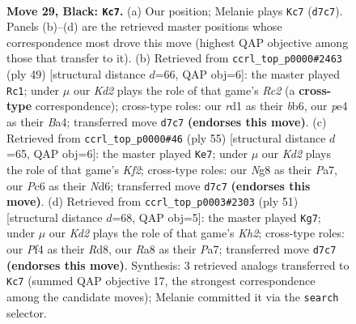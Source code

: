 \documentclass[11pt]{article}
\begin{document}
\clearpage

\begin{figure}[p]\centering
\begin{subfigure}{0.46\textwidth}\centering
\resizebox{\linewidth}{!}{%
\newchessgame
\chessboard[
  setfen={rr4nb/p2k1p1p/P1p3p1/2P5/4Pp1P/8/4NB2/3R1RK1 b - - 1 29},
  showmover=false,
  pgfstyle=straightmove, color=movearrow, markmove={d7-c7}
]}
\caption{}
\end{subfigure}\hfill
\begin{subfigure}{0.46\textwidth}\centering
\resizebox{\linewidth}{!}{%
\newchessgame
\chessboard[
  setfen={2r5/1pr1kp2/pB6/3pPp2/b3nPP1/P7/1R2B2P/5RK1 b - - 2 25},
  showmover=false,
  pgfstyle=straightmove, color=movearrow, markmove={c7-c1}
]}
\caption{}
\end{subfigure}
\\[4pt]
\begin{subfigure}{0.46\textwidth}\centering
\resizebox{\linewidth}{!}{%
\newchessgame
\chessboard[
  setfen={r6r/ppp2k2/2bnpp2/8/3P1BP1/8/PP2B2P/2R1KR2 b - - 4 28},
  showmover=false,
  pgfstyle=straightmove, color=movearrow, markmove={f7-e7}
]}
\caption{}
\end{subfigure}\hfill
\begin{subfigure}{0.46\textwidth}\centering
\resizebox{\linewidth}{!}{%
\newchessgame
\chessboard[
  setfen={3r1r2/p4p1k/b3p1p1/2p3Pp/2P5/1B2RP2/PP4P1/2KR4 b - - 0 26},
  showmover=false,
  pgfstyle=straightmove, color=movearrow, markmove={h7-g7}
]}
\caption{}
\end{subfigure}
\caption{\textbf{Move 29, Black: \texttt{Kc7}.} (a) Our position; Melanie plays \texttt{Kc7} (\texttt{d7c7}). Panels (b)--(d) are the retrieved master positions whose correspondence most drove this move (highest QAP objective among those that transfer to it). (b) Retrieved from \texttt{ccrl\_top\_p0000\#2463} (ply 49) [structural distance $d$=66, QAP obj=6]: the master played \texttt{Rc1}; under $\mu$ our \emph{Kd2} plays the role of that game's \emph{Rc2} (a \textbf{cross-type} correspondence); cross-type roles: our \emph{r}d1 as their \emph{b}b6, our \emph{p}e4 as their \emph{B}a4; transferred move \texttt{d7c7} \textbf{(endorses this move)}. (c) Retrieved from \texttt{ccrl\_top\_p0000\#46} (ply 55) [structural distance $d$=65, QAP obj=6]: the master played \texttt{Ke7}; under $\mu$ our \emph{Kd2} plays the role of that game's \emph{Kf2}; cross-type roles: our \emph{N}g8 as their \emph{P}a7, our \emph{P}c6 as their \emph{N}d6; transferred move \texttt{d7c7} \textbf{(endorses this move)}. (d) Retrieved from \texttt{ccrl\_top\_p0003\#2303} (ply 51) [structural distance $d$=68, QAP obj=5]: the master played \texttt{Kg7}; under $\mu$ our \emph{Kd2} plays the role of that game's \emph{Kh2}; cross-type roles: our \emph{P}f4 as their \emph{R}d8, our \emph{R}a8 as their \emph{P}a7; transferred move \texttt{d7c7} \textbf{(endorses this move)}. Synthesis: 3 retrieved analogs transferred to \texttt{Kc7} (summed QAP objective 17, the strongest correspondence among the candidate moves); Melanie committed it via the \texttt{search} selector.}
\label{fig:thought-m57}
\end{figure}
\end{document}
